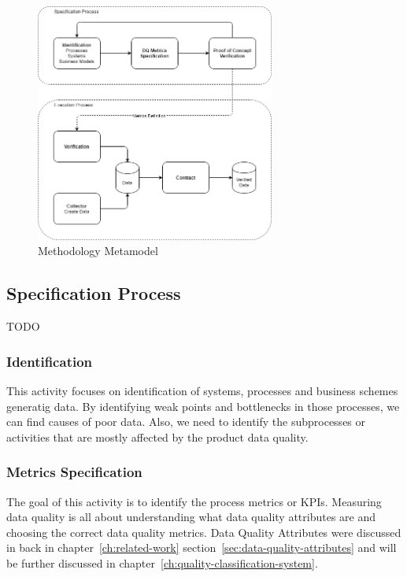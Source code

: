 \begin{figure}[htb]
    \centering
    \includegraphics[width=0.7\textwidth]{figures/dq-methodology.png}
    \caption{Methodology Metamodel}
    \label{fig:methodology-metamodel}
\end{figure}
\FloatBarrier

\subsection{Specification Process}

TODO

\subsubsection{Identification}

This activity focuses on identification of systems, processes and business schemes generatig data.
By identifying weak points and bottlenecks in those processes, we can find causes of poor data.
Also, we need to identify the subprocesses or activities that are mostly affected by the product data quality.

\subsubsection{Metrics Specification}

The goal of this activity is to identify the process metrics or KPIs.
Measuring data quality is all about understanding what data quality attributes are and choosing the correct data quality metrics.
Data Quality Attributes were discussed in back in chapter~\ref{ch:related-work} section~\ref{sec:data-quality-attributes} and will be further discussed in chapter~\ref{ch:quality-classification-system}.

